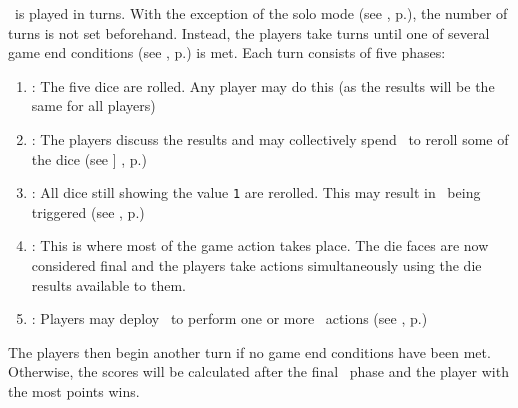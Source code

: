 \asciiplanets\ is played in turns.  With the exception of the solo mode (see 
, p.\pageref{sec:playercount}), the number of turns is
not set beforehand.  Instead, the players take turns until one of several game 
end conditions (see , p.\pageref{sec:endgame}) is met.
\newline\newline
Each turn consists of five phases:
\begin{enumerate}
	\item \textbf{\dice}: The five dice are rolled.  Any player may do this (as 
        the results will be the same for all players)
	\item \textbf{\diplomacy}: The players discuss the results and may 
        collectively spend \currency\ to reroll some of the dice (see ]
        , p.\pageref{sec:diplomacy})
	\item \textbf{\disasters}: All dice still showing the value \texttt{1} are 
        rerolled.  This may result in \disasters\ being triggered (see 
        , p.\pageref{sec:disasters})
  \item \textbf{\development}: This is where most of the game action takes 
        place. The die faces are now considered final and the players take 
        actions simultaneously using the die results available to them.
  \item \textbf{\deployment}: Players may deploy \squadrons\ to perform one or 
        more \military\ actions (see , 
        p.\pageref{sec:military})
\end{enumerate}
The players then begin another turn if no game end conditions have been met.  
Otherwise, the scores will be calculated after the final \deployment\ phase and 
the player with the most points wins.
